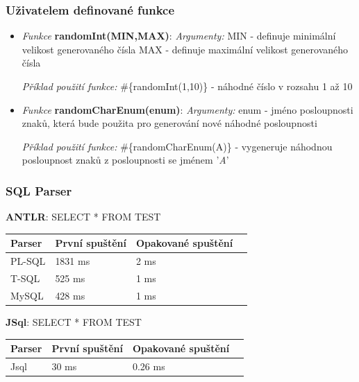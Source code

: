 \documentclass{beamer}
\begin{document}
\begin{frame}
  \frametitle{Uživatelem definované funkce}
  \begin{itemize}
\item 
\textit{Funkce} \textbf{randomInt(MIN,MAX)}:\newline
\textit{Argumenty:}\newline
MIN - definuje minimální velikost generovaného čísla\newline
MAX - definuje maximální velikost generovaného čísla\newline

\textit{Příklad použití funkce:}\newline
\#\{randomInt(1,10)\} - náhodné číslo v rozsahu 1 až 10

\item
\textit{Funkce} \textbf{randomCharEnum(enum)}:\newline
\textit{Argumenty:}\newline
enum - jméno posloupnosti znaků, která bude použita pro generování nové náhodné posloupnosti\newline

\textit{Příklad použití funkce:}\newline
\#\{randomCharEnum(A)\} - vygeneruje náhodnou posloupnost znaků z posloupnosti se jménem '\textit{A}'

\end{itemize}
\end{frame}



\begin{frame}
  \frametitle{SQL Parser}
\begin{table}[!htbp]
	\small{\textbf{ANTLR}: SELECT * FROM TEST}
	\vskip 0.1cm
	\begin{tabular}{llll}
		\hline
		Parser & První spuštění & Opakované spuštění\\
		\hline
		PL-SQL & 1831 ms & 2 ms  \\
        T-SQL & 525 ms & 1 ms  \\
        MySQL & 428 ms & 1 ms  \\
		\hline
	\end{tabular}
\end{table}

\begin{table}[!htbp]
	\small{\textbf{JSql}: SELECT * FROM TEST}
	\vskip 0.1cm
	\begin{tabular}{llll}
		\hline
		Parser & První spuštění & Opakované spuštění\\
		\hline
		Jsql & 30 ms & 0.26 ms \\
		\hline
	\end{tabular}
\end{table}

\end{frame}
\end{document}
